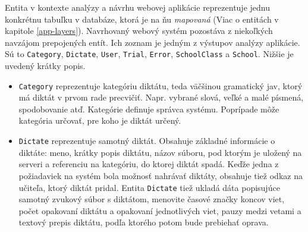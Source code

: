 \documentclass[12pt,oneside]{fithesis2}
\begin{document}
      \par Entita v kontexte analýzy a návrhu webovej aplikácie reprezentuje jednu konkrétnu tabuľku v databáze, ktorá je na ňu \textit{mapovaná} (Viac o entitách v kapitole \ref{app-layers}). Navrhovaný webový systém pozostáva z niekoľkých navzájom prepojených entít. Ich zoznam je jedným z výstupov analýzy aplikácie. Sú to \texttt{Category}, \texttt{Dictate}, \texttt{User}, \texttt{Trial}, \texttt{Error}, \texttt{SchoolClass} a \texttt{School}. Nižšie je uvedený krátky popis.
      \begin{itemize}
	\item \texttt{Category} reprezentuje kategóriu diktátu, teda väčšinou gramatický jav, ktorý má diktát v prvom rade precvičiť. Napr. vybrané slová, veľké a malé písmená, spodobovanie atď. Kategórie definuje správca systému. Poprípade môže kategória určovať, pre koho je diktát určený.
	\item \texttt{Dictate} reprezentuje samotný diktát. Obsahuje základné informácie o diktáte: meno, krátky popis diktátu, názov súboru, pod ktorým je uložený na serveri a referenciu na kategóriu, do ktorej diktát spadá. Keďže jedna z požiadaviek na systém bola možnosť nahrávať diktáty, obsahuje tiež odkaz na učiteľa, ktorý diktát pridal. Entita \texttt{Dictate} tiež ukladá dáta popisujúce samotný zvukový súbor s diktátom, menovite časové značky koncov viet, počet opakovaní diktátu a opakovaní jednotlivých viet, pauzy medzi vetami a textový prepis diktátu, podľa ktorého potom bude prebiehať oprava.
\end{itemize}	
\end{document}
